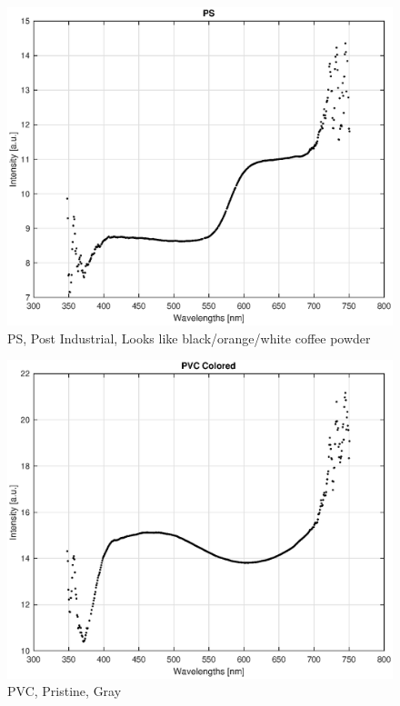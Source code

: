 \begin{appendices}
\begin{figure}
    \centering
    \includegraphics[width = 12cm]{Images/appendix/ps-postindust.eps}
    \caption{PS, Post Industrial, Looks like black/orange/white coffee powder}
    \label{fig:ps-coffee}
\end{figure}

\begin{figure}
    \centering
    \includegraphics[width = 12cm]{Images/appendix/pvc-pristine-colored.eps}
    \caption{PVC, Pristine, Gray}
    \label{fig:pvc-gray}
\end{figure}


\end{appendices}
